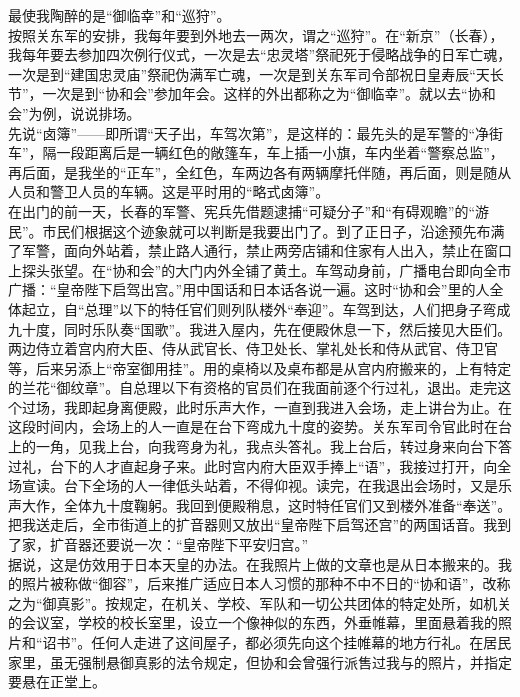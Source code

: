 最使我陶醉的是“御临幸”和“巡狩”。\\

按照关东军的安排，我每年要到外地去一两次，谓之“巡狩”。在“新京”（长春），我每年要去参加四次例行仪式，一次是去“忠灵塔”祭祀死于侵略战争的日军亡魂，一次是到“建国忠灵庙”祭祀伪满军亡魂，一次是到关东军司令部祝日皇寿辰“天长节”，一次是到“协和会”参加年会。这样的外出都称之为“御临幸”。就以去“协和会”为例，说说排场。\\

先说“卤簿”——即所谓“天子出，车驾次第”，是这样的：最先头的是军警的“净街车”，隔一段距离后是一辆红色的敞篷车，车上插一小旗，车内坐着“警察总监”，再后面，是我坐的“正车”，全红色，车两边各有两辆摩托伴随，再后面，则是随从人员和警卫人员的车辆。这是平时用的“略式卤簿”。\\

在出门的前一天，长春的军警、宪兵先借题逮捕“可疑分子”和“有碍观瞻”的“游民”。市民们根据这个迹象就可以判断是我要出门了。到了正日子，沿途预先布满了军警，面向外站着，禁止路人通行，禁止两旁店铺和住家有人出入，禁止在窗口上探头张望。在“协和会”的大门内外全铺了黄土。车驾动身前，广播电台即向全市广播：“皇帝陛下启驾出宫。”用中国话和日本话各说一遍。这时“协和会”里的人全体起立，自“总理”以下的特任官们则列队楼外“奉迎”。车驾到达，人们把身子弯成九十度，同时乐队奏“国歌”。我进入屋内，先在便殿休息一下，然后接见大臣们。两边侍立着宫内府大臣、侍从武官长、侍卫处长、掌礼处长和侍从武官、侍卫官等，后来另添上“帝室御用挂”。用的桌椅以及桌布都是从宫内府搬来的，上有特定的兰花“御纹章”。自总理以下有资格的官员们在我面前逐个行过礼，退出。走完这个过场，我即起身离便殿，此时乐声大作，一直到我进入会场，走上讲台为止。在这段时间内，会场上的人一直是在台下弯成九十度的姿势。关东军司令官此时在台上的一角，见我上台，向我弯身为礼，我点头答礼。我上台后，转过身来向台下答过礼，台下的人才直起身子来。此时宫内府大臣双手捧上“语”，我接过打开，向全场宣读。台下全场的人一律低头站着，不得仰视。读完，在我退出会场时，又是乐声大作，全体九十度鞠躬。我回到便殿稍息，这时特任官们又到楼外准备“奉送”。把我送走后，全市街道上的扩音器则又放出“皇帝陛下启驾还宫”的两国话音。我到了家，扩音器还要说一次：“皇帝陛下平安归宫。”\\

据说，这是仿效用于日本天皇的办法。在我照片上做的文章也是从日本搬来的。我的照片被称做“御容”，后来推广适应日本人习惯的那种不中不日的“协和语”，改称之为“御真影”。按规定，在机关、学校、军队和一切公共团体的特定处所，如机关的会议室，学校的校长室里，设立一个像神似的东西，外垂帷幕，里面悬着我的照片和“诏书”。任何人走进了这间屋子，都必须先向这个挂帷幕的地方行礼。在居民家里，虽无强制悬御真影的法令规定，但协和会曾强行派售过我与的照片，并指定要悬在正堂上。\\

